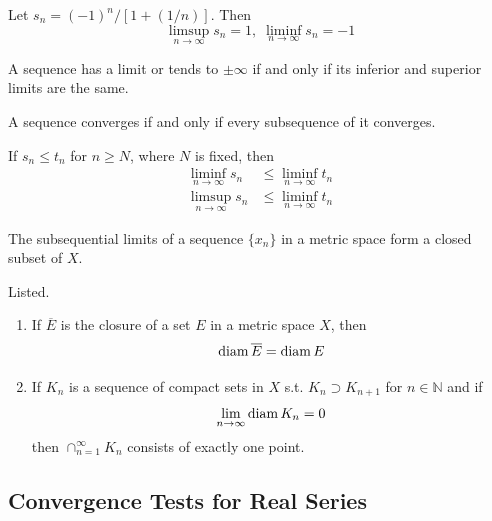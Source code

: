   \begin{example}
    Let $s_n = (-1)^n / [1 + (1/n)]$. Then 
    \begin{equation}
      \limsup_{n \rightarrow \infty} s_n = 1, \; \liminf_{n \rightarrow \infty} s_n = -1
    \end{equation}
  \end{example}

  \begin{theorem}
    A sequence has a limit or tends to $\pm \infty$ if and only if its inferior and superior limits are the same. 
  \end{theorem}

  \begin{corollary}
    A sequence converges if and only if every subsequence of it converges. 
  \end{corollary}

  \begin{theorem}
    If $s_n \leq t_n$ for $n \geq N$, where $N$ is fixed, then 
    \begin{align*}
      \liminf_{n \rightarrow \infty} s_n & \leq \liminf_{n \rightarrow \infty} t_n \\
      \limsup_{n \rightarrow \infty} s_n & \leq \liminf_{n \rightarrow \infty} t_n 
    \end{align*}
  \end{theorem}

  \begin{theorem}
    The subsequential limits of a sequence $\{x_n\}$ in a metric space form a closed subset of $X$. 
  \end{theorem}

  \begin{theorem}
    Listed. 
    \begin{enumerate}
      \item If $\overline{E}$ is the closure of a set $E$ in a metric space $X$, then 
      \[\operatorname{diam}{\overline{E}} = \operatorname{diam}{E}\]

      \item If $K_n$ is a sequence of compact sets in $X$ s.t. $K_n \supset K_{n+1}$ for $n \in \mathbb{N}$ and if 
      \[\lim_{n \rightarrow \infty} \operatorname{diam}{K_n} = 0\]
      then $\cap_{n=1}^\infty K_n$ consists of exactly one point. 
    \end{enumerate}
  \end{theorem}
 
\subsection{Convergence Tests for Real Series}

